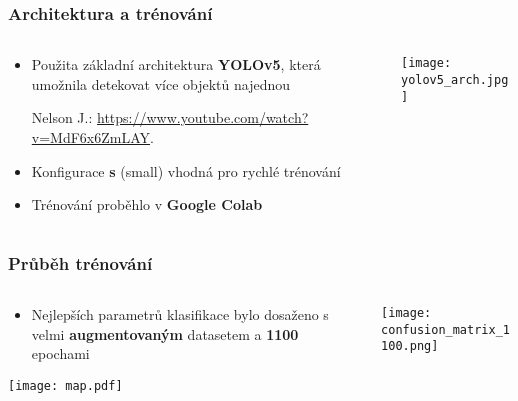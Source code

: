 \begin{frame}
   \frametitle{Architektura a trénování}
   \begin{columns}[t, onlytextwidth]
      \begin{column}[T]{0.44\textwidth}
         \begin{itemize}
            \item Použita základní architektura \textbf{YOLOv5}, která umožnila detekovat více objektů najednou
            \parbox{\textwidth}{\tiny {\color{ctu4blue}Nelson J.}: \url{https://www.youtube.com/watch?v=MdF6x6ZmLAY}.}
            \item Konfigurace \textbf{s} (small) vhodná pro rychlé trénování
            \item Trénování proběhlo v \textbf{Google Colab}
         \end{itemize}
      \end{column}
      \begin{column}[T]{0.55\textwidth}
         \centering
         \texttt{[image: yolov5\_arch.jpg]}
      \end{column}
   \end{columns}
\end{frame}

\begin{frame}
   \frametitle{Průběh trénování}
   \begin{columns}[t, onlytextwidth]
      \begin{column}[T]{0.44\textwidth}
      \begin{itemize}
         \item Nejlepších parametrů klasifikace bylo dosaženo s velmi \textbf{augmentovaným} datasetem a \textbf{1100} epochami
      \end{itemize}
         \centering
         \texttt{[image: map.pdf]}
      \end{column}
      \begin{column}[T]{0.55\textwidth}
         \centering
         \texttt{[image: confusion\_matrix\_1100.png]}
      \end{column}
   \end{columns}
\end{frame}


